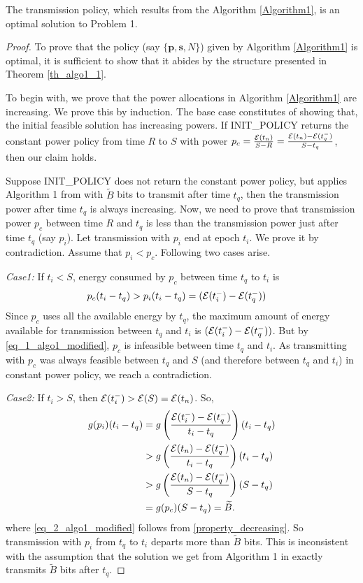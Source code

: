 \begin{theorem}
The transmission policy, which results from the Algorithm \ref{Algorithm1}, is an optimal solution to Problem 1.
\label{th_algo1_2}
\end{theorem}


\begin{proof}
To prove that the policy (say $\{\textbf{p},\textbf{s},N\}$) given by Algorithm \ref{Algorithm1} is optimal, it is sufficient to show that it abides by the structure presented in Theorem \ref{th_algo1_1}.

To begin with, we prove that the power allocations in Algorithm \ref{Algorithm1} are increasing. We prove this by induction. The base case constitutes of showing that, the initial feasible solution has increasing powers. If INIT\_POLICY returns the constant power policy from time $R$ to $S$ with power $p_c=\frac{\mathcal{E}(t_n)}{S-R}=\frac{\mathcal{E}(t_n)-\mathcal{E}(t_q^-)}{S-t_q}$, then our claim holds. 

Suppose INIT\_POLICY does not return the constant power policy, but applies Algorithm 1 from \cite{Yang} with $\widetilde{B}$ bits to transmit after time $t_q$, then the transmission power after time $t_q$ is always increasing. Now, we need to prove that transmission power $p_c$ between time $R$ and $t_q$ is less than the transmission power just after time $t_q$ (say $p_i$). Let transmission with $p_i$ end at epoch $t_i$. We prove it by contradiction. Assume that $p_i<p_c$. Following two cases arise.

\textit{Case1:} If $t_i<S$, energy consumed by $p_c$ between time $t_q$ to $t_i$ is 
\begin{align}
&p_c(t_i-t_q)>p_i(t_i-t_q)=(\ETx(t_i^-)-\ETx(t_q^-))\label{eq_1_algo1_modified}
\end{align}
Since $p_c$ uses all the available energy by $t_q$, the maximum amount of energy available for transmission between $t_q$ and $t_i$ is $(\mathcal{E}(t_i^-)-\mathcal{E}(t_q^-))$. But by \eqref{eq_1_algo1_modified}, $p_c$ is infeasible between time $t_q$ and $t_i$. As transmitting with $p_c$ was always feasible between $t_q$ and $S$ (and therefore between $t_q$ and $t_i$) in constant power policy, we reach a contradiction.        

\textit{Case2:} If $t_i>S$, then $\mathcal{E}(t_i^-)>\mathcal{E}(S)=\mathcal{E}(t_n)$. So, 
\begin{align}
g(p_i)(t_i-t_q)&=g\left(\frac{\ETx(t_i^-)-\ETx(t_q^-)}{t_i-t_q}\right)(t_i-t_q)
\\
&>g\left(\frac{\ETx(t_n)-\ETx(t_q^-)}{t_i-t_q}\right)(t_i-t_q)
\\
&>g\left(\frac{\ETx(t_n)-\ETx(t_q^-)}{S-t_q}\right)(S-t_q)\label{eq_2_algo1_modified}
\\
&=g(p_c)(S-t_q)=\widetilde{B}.
\end{align}
where \eqref{eq_2_algo1_modified} follows from \eqref{property_decreasing}. So transmission with $p_i$ from $t_q$ to $t_i$ departs more than $\widetilde{B}$ bits. This is inconsistent with the assumption that the solution we get from Algorithm 1 in \cite{Yang} exactly transmits $\widetilde{B}$ bits after $t_q$. 


\end{proof}
